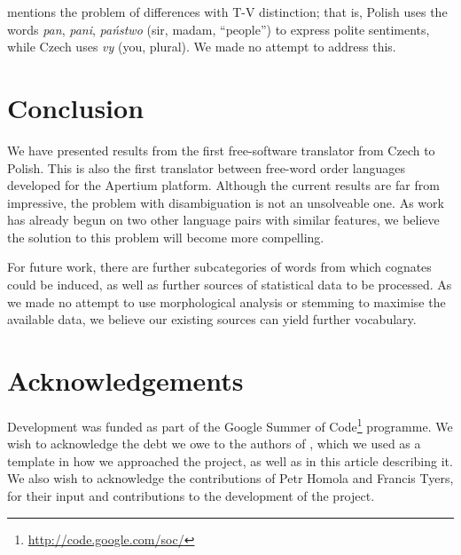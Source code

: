 \documentclass[11pt]{article}
\begin{document}
\cite{Debowski02} mentions the problem of differences with T-V distinction; that is,
Polish uses the words \emph{pan}, \emph{pani}, \emph{państwo} (sir, madam, ``people'')
to express polite sentiments, while Czech uses \emph{vy} (you, plural). We made no
attempt to address this.

\section{Conclusion}

We have presented results from the first free-software translator from Czech to 
Polish. This is also the first translator between free-word order languages
developed for the Apertium platform. Although the current results are far from
impressive, the problem with disambiguation is not an unsolveable one. As
work has already begun on two other language pairs with similar features, we
believe the solution to this problem will become more compelling.

For future work, there are further subcategories of words from which cognates
could be induced, as well as further sources of statistical data to be
processed. As we made no attempt to use morphological analysis or stemming
to maximise the available data, we believe our existing sources can yield
further vocabulary.

\section{Acknowledgements}

Development was funded as part of the Google Summer of Code\footnote{\url{http://code.google.com/soc/}} 
programme. 
We wish to acknowledge the debt we owe to the authors of \cite{tyers2009rfr}, which 
we used as a template in how we approached the project, as well as in this article
describing it.
We also wish to acknowledge the contributions of Petr Homola and Francis Tyers, for their
input and contributions to the development of the project.



\end{document}
